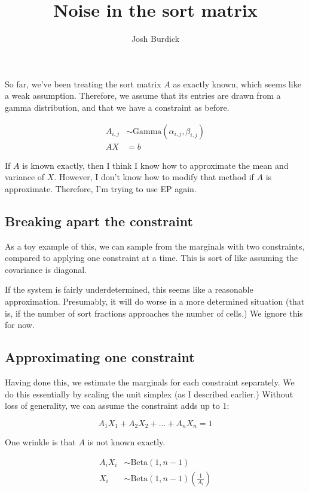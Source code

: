 \documentclass{article}\usepackage[]{graphicx}\usepackage[]{color}
\title{Noise in the sort matrix}
\author{Josh Burdick}
\begin{document}
\maketitle



So far, we've been treating the sort matrix $A$ as exactly known,
which seems like a weak assumption. Therefore, we assume that
its entries are drawn from a gamma distribution, and that
we have a constraint as before.

\begin{align*}
A_{i,j} &\sim \mathrm{Gamma}(\alpha_{i,j},\beta_{i,j}) \\
AX &= b
\end{align*}

If $A$ is known exactly, then I think I know how to approximate
the mean and variance of $X$. However, I don't know how to
modify that method if $A$ is approximate. Therefore, I'm
trying to use EP again.

\subsection{Breaking apart the constraint}

As a toy example of this, we can sample from the
marginals with two constraints, compared to applying
one constraint at a time. This is sort of like assuming
the covariance is diagonal.





If the system is fairly underdetermined, this seems like a
reasonable approximation. Presumably, it will do worse
in a more determined situation (that is, if the number
of sort fractions approaches the number of cells.) We
ignore this for now.

\subsection{Approximating one constraint}

Having done this, we estimate the marginals for each
constraint separately. We do this essentially by
scaling the unit simplex (as I described earlier.)
Without loss of generality, we can assume the constraint
adds up to 1:

\[
A_1 X_1 + A_2 X_2 + ... + A_n X_n = 1
\]

One wrinkle is that $A$ is not known exactly.

\begin{align*}
A_i X_i &\sim \mathrm{Beta}(1, n-1) \\
X_i &\sim {\mathrm{Beta}(1, n-1)}(\frac{1}{A_i})
\end{align*}
\end{document}
